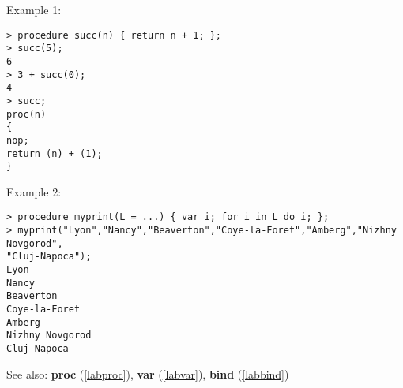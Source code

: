 \noindent Example 1: 
\begin{center}\begin{minipage}{15cm}\begin{Verbatim}[frame=single]
> procedure succ(n) { return n + 1; };
> succ(5);
6
> 3 + succ(0);
4
> succ;
proc(n)
{
nop;
return (n) + (1);
}
\end{Verbatim}
\end{minipage}\end{center}
\noindent Example 2: 
\begin{center}\begin{minipage}{15cm}\begin{Verbatim}[frame=single]
> procedure myprint(L = ...) { var i; for i in L do i; };
> myprint("Lyon","Nancy","Beaverton","Coye-la-Foret","Amberg","Nizhny Novgorod",
"Cluj-Napoca");
Lyon
Nancy
Beaverton
Coye-la-Foret
Amberg
Nizhny Novgorod
Cluj-Napoca
\end{Verbatim}
\end{minipage}\end{center}
See also: \textbf{proc} (\ref{labproc}), \textbf{var} (\ref{labvar}), \textbf{bind} (\ref{labbind})
